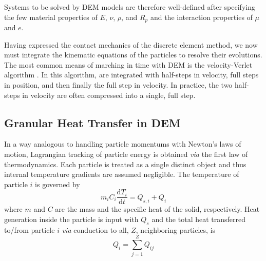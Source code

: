 \documentclass[11pt]{report} %
\begin{document}
Systems to be solved by DEM models are therefore well-defined after specifying the few material properties of $E$, $\nu$, $\rho$, and $R_p$ and the interaction properties of $\mu$ and $e$.

Having expressed the contact mechanics of the discrete element method, we now must integrate the kinematic equations of the particles to resolve their evolutions. The most common means of marching in time with DEM is the velocity-Verlet algorithm \cite{Kruggel-Emden2008}. In this algorithm,  are integrated with half-steps in velocity, full steps in position, and then finally the full step in velocity. In practice, the two half-steps in velocity are often compressed into a single, full step.


\subsection{Granular Heat Transfer in DEM}\label{sec:dem-heat-transfer}

In a way analogous to handling particle momentums with Newton's laws of motion, Lagrangian tracking of particle energy is obtained \textit{via} the first law of thermodynamics. Each particle is treated as a single distinct object and thus internal temperature gradients are assumed negligible. The temperature of particle $i$ is governed by
\begin{equation}\label{eq:thermoFirstLaw}
	m_iC_i\frac{\mathrm{d}T_i}{\mathrm{d}t} = Q_{s,i} + Q_{i}
\end{equation}
where $m$ and $C$ are the mass and the specific heat of the solid, respectively. Heat generation inside the particle is input with $Q_{s}$ and the total heat transferred to/from particle $i$ \textit{via} conduction to all, $Z$, neighboring particles, is
\begin{equation}
	Q_i = \sum_{j=1}^Z Q_{ij}
\end{equation}
\end{document}
